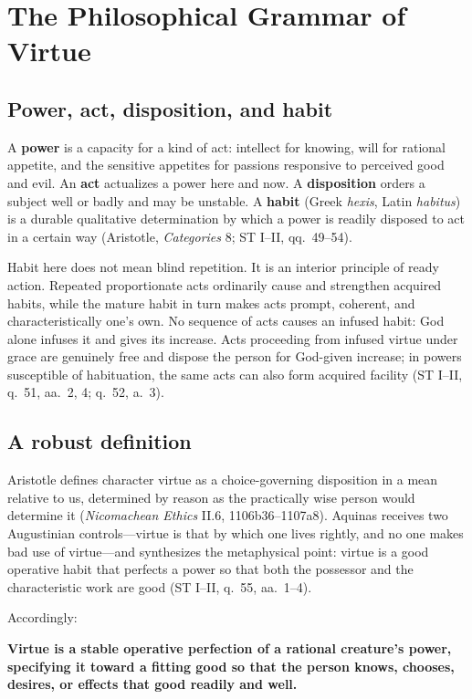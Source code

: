 \section{The Philosophical Grammar of Virtue}
\label{sec:grammar}

\subsection{Power, act, disposition, and habit}

A \textbf{power} is a capacity for a kind of act: intellect for knowing, will for rational appetite, and the sensitive appetites for passions responsive to perceived good and evil. An \textbf{act} actualizes a power here and now. A \textbf{disposition} orders a subject well or badly and may be unstable. A \textbf{habit} (Greek \emph{hexis}, Latin \emph{habitus}) is a durable qualitative determination by which a power is readily disposed to act in a certain way (Aristotle, \emph{Categories} 8; ST I--II, qq.~49--54).

Habit here does not mean blind repetition. It is an interior principle of ready action. Repeated proportionate acts ordinarily cause and strengthen acquired habits, while the mature habit in turn makes acts prompt, coherent, and characteristically one's own. No sequence of acts causes an infused habit: God alone infuses it and gives its increase. Acts proceeding from infused virtue under grace are genuinely free and dispose the person for God-given increase; in powers susceptible of habituation, the same acts can also form acquired facility (ST I--II, q.~51, aa.~2, 4; q.~52, a.~3).

\subsection{A robust definition}

Aristotle defines character virtue as a choice-governing disposition in a mean relative to us, determined by reason as the practically wise person would determine it (\emph{Nicomachean Ethics} II.6, 1106b36--1107a8). Aquinas receives two Augustinian controls---virtue is that by which one lives rightly, and no one makes bad use of virtue---and synthesizes the metaphysical point: virtue is a good operative habit that perfects a power so that both the possessor and the characteristic work are good (ST I--II, q.~55, aa.~1--4).

Accordingly:

\begin{studyframe}
\textbf{Virtue is a stable operative perfection of a rational creature's power, specifying it toward a fitting good so that the person knows, chooses, desires, or effects that good readily and well.}
\end{studyframe}

